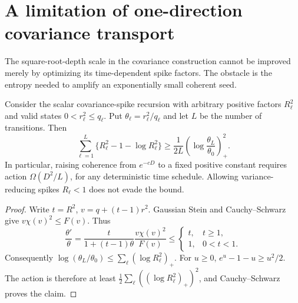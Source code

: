 \section{A limitation of one-direction covariance transport}
\label{sec:spike-method-barrier}
The square-root-depth scale in the covariance construction cannot be improved merely by optimizing its time-dependent spike factors. The obstacle is the entropy needed to amplify an exponentially small coherent seed.

\begin{proposition}
\label{prop:coherence-action-barrier}
Consider the scalar covariance-spike recursion with arbitrary positive factors $R_\ell^2$ and valid states $0<r_\ell^2\le q_\ell$. Put $\theta_\ell=r_\ell^2/q_\ell$ and let $L$ be the number of transitions. Then
\[
 \sum_{\ell=1}^L
       \{R_\ell^2-1-\log R_\ell^2\}
 \ge\frac1{2L}
       \left(\log\frac{\theta_L}{\theta_0}\right)_+^2.
\]
In particular, raising coherence from $e^{-cD}$ to a fixed positive constant requires action $\Omega(D^2/L)$, for any deterministic time schedule. Allowing variance-reducing spikes $R_\ell<1$ does not evade the bound.
\end{proposition}
\begin{proof}
Write $t=R^2$, $v=q+(t-1)r^2$. Gaussian Stein and Cauchy--Schwarz give $v\chi(v)^2\le F(v)$. Thus
\[
 \frac{\theta'}\theta
 =\frac{t}{1+(t-1)\theta}\frac{v\chi(v)^2}{F(v)}
 \le\begin{cases}t,&t\ge1,\\1,&0<t<1.\end{cases}
\]
Consequently $\log(\theta_L/\theta_0)\le\sum_\ell(\log R_\ell^2)_+$.
For $u\ge0$, $e^u-1-u\ge u^2/2$. The action is therefore at least
$\tfrac12\sum_\ell((\log R_\ell^2)_+)^2$, and Cauchy--Schwarz proves the claim.
\end{proof}

